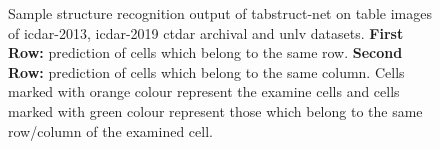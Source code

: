 \documentclass[runningheads]{llncs}
\begin{document}
\begin{figure}[ht!]
\begin{center}
\hspace{-0.01\textwidth}
\hspace{-0.01\textwidth}
\vspace{0.003\textwidth}
\hspace{-0.01\textwidth}
\hspace{-0.01\textwidth}
\end{center}
\caption{Sample structure recognition output of {\sc t}ab{\sc s}truct-{\sc n}et on table images of {\sc icdar-2013}, {\sc icdar-2019} c{\sc td}a{\sc r} archival and {\sc unlv} datasets. \textbf{First Row:} prediction of cells which belong to the same row. \textbf{Second Row:} prediction of cells which belong to the same column. Cells marked with orange colour represent the examine cells and cells marked with green colour represent those which belong to the same row/column of the examined cell.}
\label{fig_struture_recognition_result}
\end{figure}
\end{document}
